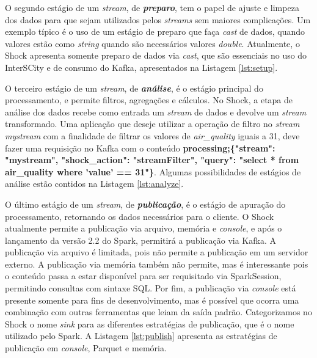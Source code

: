

O segundo estágio de um \textit{stream}, de \textit{\textbf{preparo}}, tem o papel
de ajuste e limpeza dos dados para que sejam utilizados pelos \textit{streams}
sem maiores complicações. Um exemplo típico é o uso de um estágio de preparo
que faça \textit{cast} de dados, quando valores estão como
\textit{string} quando são necessários valores \textit{double}. Atualmente,
o Shock apresenta somente preparo de dados via \textit{cast}, que são essenciais
no uso do InterSCity e de consumo do Kafka, apresentados na Listagem
\ref{lst:setup}.



O terceiro estágio de um \textit{stream}, de \textit{\textbf{análise}}, é o
estágio principal do processamento, e permite filtros, agregações e cálculos.
No Shock, a etapa de análise dos dados recebe como entrada um \textit{stream}
de dados e devolve um \textit{stream} transformado. Uma aplicação que deseje
utilizar a operação de filtro no \textit{stream} \textit{mystream} com a finalidade
de filtrar os valores de \textit{air\_quality} iguais a 31, deve fazer uma
requisição no Kafka com o conteúdo \small{\textbf{processing;\{"stream": "mystream",
"shock\_action": "streamFilter", "query": "select * from air\_quality where
'value' == 31"\}}}. Algumas possibilidades de estágios de análise
estão contidos na Listagem \ref{lst:analyze}.



O último estágio de um \textit{stream}, de \textit{\textbf{publicação}}, é o estágio
de apuração do processamento, retornando os dados necessários para o cliente.
O Shock atualmente permite a publicação via arquivo, memória e \textit{console}, e após o
lançamento da versão 2.2 do Spark, permitirá a publicação via Kafka. A
publicação via arquivo é limitada, pois não permite a publicação em um servidor
externo. A publicação via memória também não permite, mas é interessante pois
o conteúdo passa a estar disponível para ser requisitado via SparkSession,
permitindo consultas com sintaxe SQL. Por fim, a publicação via \textit{console} está
presente somente para fins de desenvolvimento, mas é possível que ocorra uma
combinação com outras ferramentas que leiam da saída padrão. Categorizamos
no Shock o nome \textit{sink} para as diferentes estratégias de publicação,
que é o nome utilizado pelo Spark. A Listagem \ref{lst:publish} apresenta as
estratégias de publicação em \textit{console}, Parquet e memória.

